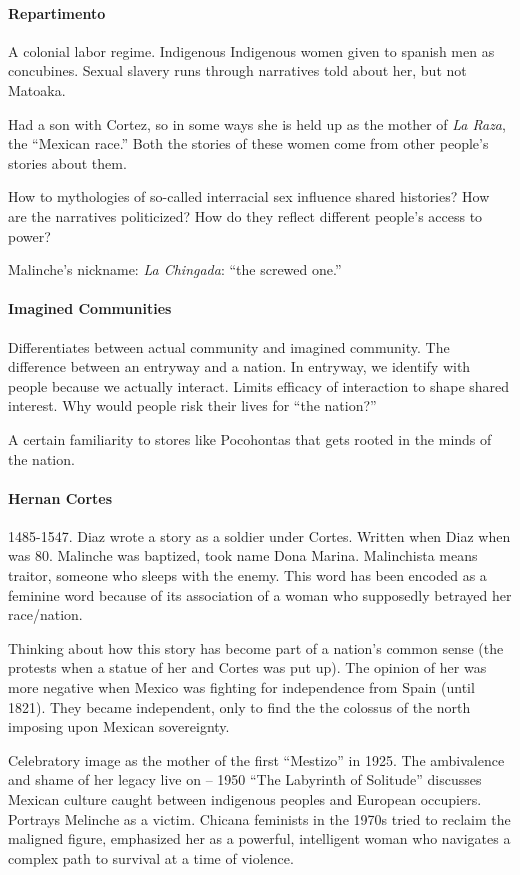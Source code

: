 \paragraph{Repartimento} A colonial labor regime. Indigenous  Indigenous women given to spanish men as concubines. Sexual slavery runs through narratives told about her, but not Matoaka.

Had a son with Cortez, so in some ways she is held up as the mother of \textit{La Raza}, the ``Mexican race.'' Both the stories of these women come from other people's stories about them.

How to mythologies of so-called interracial sex influence shared histories? How are the narratives politicized? How do they reflect different people's access to power?

Malinche's nickname: \textit{La Chingada}: ``the screwed one.''

\paragraph{Imagined Communities} Differentiates between actual community and imagined community. The difference between an entryway and a nation. In entryway, we identify with people because we actually interact. Limits efficacy of interaction to shape shared interest. Why would people risk their lives for ``the nation?''

A certain familiarity to stores like Pocohontas that gets rooted in the minds of the nation.

\paragraph{Hernan Cortes} 1485-1547. Diaz wrote a story as a soldier under Cortes. Written when Diaz when was 80.
Malinche was baptized, took name Dona Marina. Malinchista means traitor, someone who sleeps with the enemy. This word has been encoded as a feminine word because of its association of a woman who supposedly betrayed her race/nation.

Thinking about how this story has become part of a nation's common sense (the protests when a statue of her and Cortes was put up). The opinion of her was more negative when Mexico was fighting for independence from Spain (until 1821). They became independent, only to find the the colossus of the north imposing upon Mexican sovereignty.

Celebratory image as the mother of the first ``Mestizo'' in 1925. The ambivalence and shame of her legacy live on -- 1950 ``The Labyrinth of Solitude'' discusses Mexican culture caught between indigenous peoples and European occupiers. Portrays Melinche as a victim. Chicana feminists in the 1970s tried to reclaim the maligned figure, emphasized her as a powerful, intelligent woman who navigates a complex path to survival at a time of violence.


